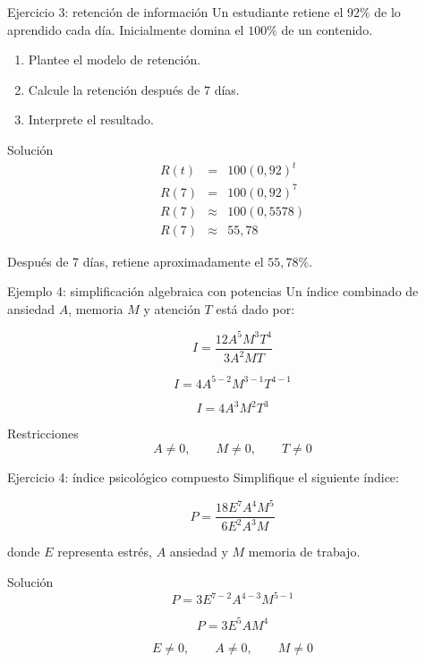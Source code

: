 \documentclass[aspectratio=169]{beamer}
\begin{document}
	\begin{frame}{Ejercicio 3: retención de información}
		Un estudiante retiene el \(92\%\) de lo aprendido cada día. Inicialmente domina el \(100\%\) de un contenido.
		
		\begin{enumerate}
			\item Plantee el modelo de retención.
			\item Calcule la retención después de \(7\) días.
			\item Interprete el resultado.
		\end{enumerate}
		
		\pause
		
		\begin{block}{Solución}
			\[
			\begin{array}{rcl}
				R(t)   & = & 100(0{,}92)^t \\[0.3cm]
				R(7)   & = & 100(0{,}92)^7 \\[0.3cm]
				R(7)   & \approx & 100(0{,}5578) \\[0.3cm]
				R(7)   & \approx & 55{,}78
			\end{array}
			\]
			
			Después de 7 días, retiene aproximadamente el \(55{,}78\%\).
		\end{block}
	\end{frame}
	
	\begin{frame}{Ejemplo 4: simplificación algebraica con potencias}
		Un índice combinado de ansiedad \(A\), memoria \(M\) y atención \(T\) está dado por:
		
		\[
		I=\frac{12A^5M^3T^4}{3A^2MT}
		\]
		
		\[
		I=4A^{5-2}M^{3-1}T^{4-1}
		\]
		
		\[
		I=4A^3M^2T^3
		\]
		
		\begin{block}{Restricciones}
			\[
			A\neq 0,\qquad M\neq 0,\qquad T\neq 0
			\]
		\end{block}
	\end{frame}
	
	\begin{frame}{Ejercicio 4: índice psicológico compuesto}
		Simplifique el siguiente índice:
		
		\[
		P=\frac{18E^7A^4M^5}{6E^2A^3M}
		\]
		
		donde \(E\) representa estrés, \(A\) ansiedad y \(M\) memoria de trabajo.
		
		\pause
		
		\begin{block}{Solución}
			\[
			P=3E^{7-2}A^{4-3}M^{5-1}
			\]
			
			\[
			P=3E^5AM^4
			\]
			
			\[
			E\neq 0,\qquad A\neq 0,\qquad M\neq 0
			\]
		\end{block}
	\end{frame}
	
\end{document}
